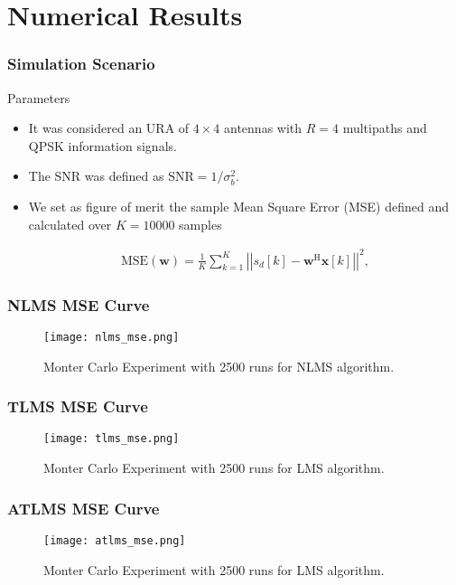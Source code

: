 \documentclass[10pt]{beamer}
\begin{document}
\section{Numerical Results}
\begin{frame}
    \frametitle{Simulation Scenario}
    \begin{block}{Parameters}
        \begin{itemize}
            
            \item It was considered an URA of $4 \times 4$ antennas with $R = 4$ multipaths and QPSK information signals.
            
            \item The SNR was defined as $\text{SNR} = 1/\sigma^{2}_{b}$.

            \item We set as figure of merit the sample Mean Square Error (MSE) defined and calculated over $K = 10000$ samples
            
                \begin{align}
                    \text{MSE}(\boldsymbol{w}) = \frac{1}{K} \sum^{K}_{k = 1} \left|\left| s_{d}[k] - \boldsymbol{w}^{\text{H}} \boldsymbol{x}[k] \right|\right|^{2},
                \end{align}

        \end{itemize}
    \end{block}
\end{frame}

\begin{frame}
    \frametitle{NLMS MSE Curve}
    \begin{figure}
        \centering
        \texttt{[image: nlms\_mse.png]}
        \caption{Monter Carlo Experiment with 2500 runs for NLMS algorithm.}
        \label{fig:nlms} 
    \end{figure}
\end{frame}

\begin{frame}
    \frametitle{TLMS MSE Curve}
    \begin{figure}
        \centering
        \texttt{[image: tlms\_mse.png]}
        \caption{Monter Carlo Experiment with 2500 runs for LMS algorithm.}
        \label{fig:tlms} 
    \end{figure}
\end{frame}

\begin{frame}
    \frametitle{ATLMS MSE Curve}
    \begin{figure}
        \centering
        \texttt{[image: atlms\_mse.png]}
        \caption{Monter Carlo Experiment with 2500 runs for LMS algorithm.}
        \label{fig:atlms} 
    \end{figure}
\end{frame}
\end{document}
